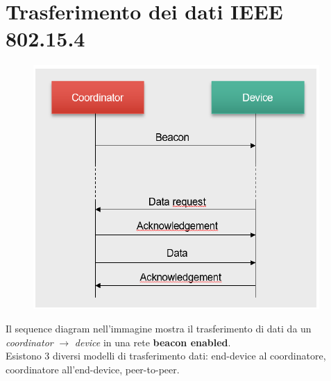 \section{Trasferimento dei dati IEEE 802.15.4}

\begin{figure}[htbp]
   \centering
   \includegraphics{images/questions/Schermata del 2023-10-20 11-49-16.png}
   \label{fig:dom22}
\end{figure}

Il sequence diagram nell'immagine mostra il trasferimento di dati da un \textit{coordinator} $\longrightarrow$ \textit{device} in una rete \textbf{beacon enabled}.
\\Esistono 3 diversi modelli di trasferimento dati: end-device al coordinatore, coordinatore all'end-device, peer-to-peer. 

